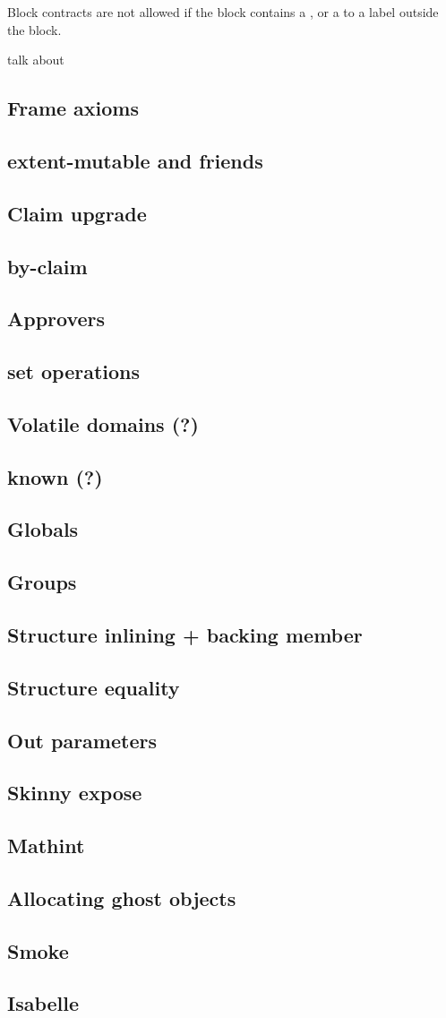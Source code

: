 Block contracts are not allowed if the block contains a ,
or a  to a label outside the block.

\itodo{} talk about 

\subsection{Frame axioms}
\subsection{extent-mutable and friends}
\subsection{Claim upgrade}
\subsection{by-claim}
\subsection{Approvers}
\subsection{set operations}
\subsection{Volatile domains (?)}
\subsection{known (?)}

\subsection{Globals}
\subsection{Groups}
\subsection{Structure inlining + backing member}
\subsection{Structure equality}
\subsection{Out parameters}
\subsection{Skinny expose}
\subsection{Mathint}
\subsection{Allocating ghost objects}
\subsection{Smoke}
\subsection{Isabelle}
